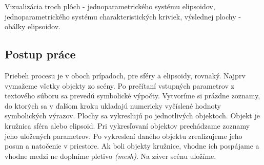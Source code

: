 Vizualizácia troch plôch - jednoparametrického systému elipsoidov, jednoparametrického systému charakteristických kriviek, výslednej plochy - obálky elipsoidov.

\subsection{Postup práce}
Priebeh procesu je v oboch prípadoch, pre sféry a elipsoidy, rovnaký.
Najprv vymažeme všetky objekty zo scény. Po prečítaní vstupných parametrov z textového súboru sa prevedú symbolické výpočty. Vytvoríme si prázdne zoznamy, do ktorých sa v ďalšom kroku ukladajú numericky vyčíslené hodnoty symbolických výrazov. Plochy sa vykresľujú po jednotlivých objektoch. Objekt je kružnica sféra alebo elipsoid. Pri vykresľovaní objektov prechádzame zoznamy jeho uložených parametrov. Po vykreslení daného objektu zrealizujeme jeho posun a natočenie v priestore. Ak boli objekty kružnice, vhodne ich pospájame a vhodne medzi ne doplníme pletivo \textit{(mesh)}. Na záver scénu uložíme.

